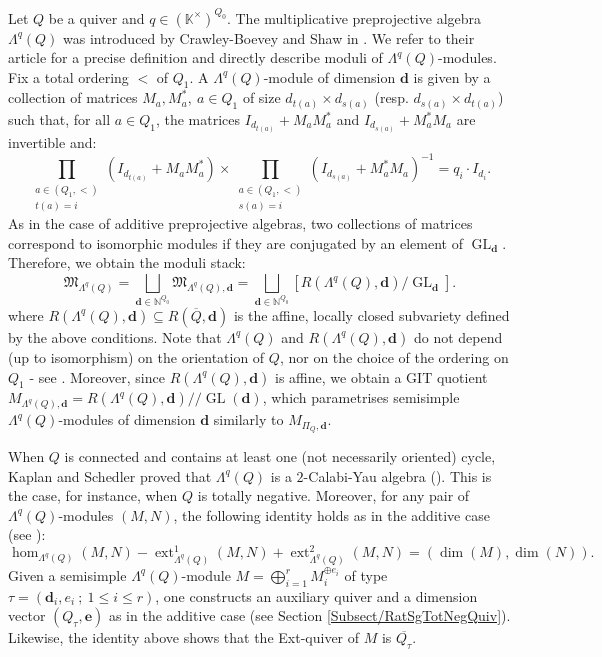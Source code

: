 \documentclass[11pt,english]{article}
\numberwithin{equation}{section}
\numberwithin{figure}{section}
\theoremstyle{definition}
\theoremstyle{plain}
\theoremstyle{remark}
\DeclareMathOperator{\ext}{ext}
\DeclareMathOperator{\GL}{GL}
\newcommand\dd{\mathbf{d}}
\newcommand\ee{\mathbf{e}}
\newcommand\KK{\mathbb{K}}
\newcommand\git{/\!\!/}
\begin{document}
Let $Q$ be a quiver and $q\in(\KK^{\times})^{Q_{0}}$. The multiplicative
preprojective algebra $\Lambda^{q}(Q)$ was introduced by Crawley-Boevey
and Shaw in \cite{CBS06}. We refer to their article for a precise
definition and directly describe moduli of $\Lambda^{q}(Q)$-modules.
Fix a total ordering $<$ of $Q_{1}$. A $\Lambda^{q}(Q)$-module
of dimension $\dd$ is given by a collection of matrices $M_{a},M_{a}^{*},\ a\in Q_{1}$
of size $d_{t(a)}\times d_{s(a)}$ (resp. $d_{s(a)}\times d_{t(a)}$)
such that, for all $a\in Q_{1}$, the matrices $I_{d_{t(a)}}+M_{a}M_{a}^{*}$
and $I_{d_{s(a)}}+M_{a}^{*}M_{a}$ are invertible and:\[
\prod_{\substack{a\in (Q_1,<) \\ t(a)=i}}(I_{d_{t(a)}}+M_aM_a^*)\times\prod_{\substack{a\in (Q_1,<) \\ s(a)=i}}(I_{d_{s(a)}}+M_a^*M_a)^{-1}=q_i\cdot I_{d_i}.
\]As in the case of additive preprojective algebras, two collections
of matrices correspond to isomorphic modules if they are conjugated
by an element of $\GL_{\dd}$. Therefore, we obtain the moduli stack:\[
\mathfrak{M}_{\Lambda^{q}(Q)}
=\bigsqcup_{\dd\in\mathbb{N}^{Q_0}}\mathfrak{M}_{\Lambda^{q}(Q),\dd}
=\bigsqcup_{\dd\in\mathbb{N}^{Q_0}}[R(\Lambda^{q}(Q),\dd)/\GL_{\dd}].
\]where $R(\Lambda^{q}(Q),\dd)\subseteq R(\overline{Q},\dd)$ is the
affine, locally closed subvariety defined by the above conditions.
Note that $\Lambda^{q}(Q)$ and $R(\Lambda^{q}(Q),\dd)$ do not depend
(up to isomorphism) on the orientation of $Q$, nor on the choice
of the ordering on $Q_{1}$ - see \cite[Thm. 1.4.]{CBS06}. Moreover,
since $R(\Lambda^{q}(Q),\dd)$ is affine, we obtain a GIT quotient
$M_{\Lambda^{q}(Q),\dd}=R(\Lambda^{q}(Q),\dd)\git\GL(\dd)$, which
parametrises semisimple $\Lambda^{q}(Q)$-modules of dimension $\dd$
similarly to $M_{\Pi_{Q},\dd}$.

When $Q$ is connected and contains at least one (not necessarily
oriented) cycle, Kaplan and Schedler proved that $\Lambda^{q}(Q)$
is a $2$-Calabi-Yau algebra (\cite[Thm. 1.2.]{KS23a}). This is the
case, for instance, when $Q$ is totally negative. Moreover, for any
pair of $\Lambda^{q}(Q)$-modules $(M,N)$, the following identity
holds as in the additive case (see \cite[Thm. 1.6.]{CBS06}):\[
\hom_{\Lambda^{q}(Q)}(M,N)-\ext_{\Lambda^{q}(Q)}^1(M,N)+\ext_{\Lambda^{q}(Q)}^2(M,N)=(\dim(M),\dim(N)).
\]Given a semisimple $\Lambda^{q}(Q)$-module $M=\bigoplus_{i=1}^{r}M_{i}^{\oplus e_{i}}$
of type $\tau=(\dd_{i},e_{i}\ ;\ 1\leq i\leq r)$, one constructs
an auxiliary quiver and a dimension vector $(Q_{\tau},\ee)$ as in
the additive case (see Section \ref{Subsect/RatSgTotNegQuiv}). Likewise,
the identity above shows that the Ext-quiver of $M$ is $\overline{Q_{\tau}}$.
\end{document}
